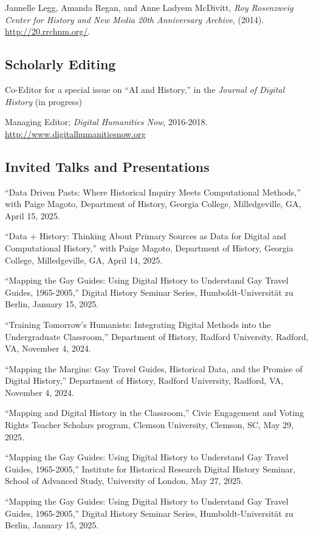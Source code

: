 \documentclass[11pt]{article}
\begin{document}
Jannelle Legg, Amanda Regan, and Anne Ladyem McDivitt, \emph{Roy Rosenzweig Center for History and New Media 20th Anniversary Archive}, (2014). \url{http://20.rrchnm.org/}.

\subsection{Scholarly Editing}
Co-Editor for a special issue on “AI and History,” in the \emph{Journal of Digital History} (in progress)

Managing Editor; \emph{Digital Humanities Now}, 2016-2018. \url{http://www.digitalhumanitiesnow.org}

\subsection{Invited Talks and Presentations}

``Data Driven Pasts: Where Historical Inquiry Meets Computational Methods,'' with Paige Magoto, Department of History, Georgia College, Milledgeville, GA, April 15, 2025.

``Data + History: Thinking About Primary Sources as Data for Digital and Computational History,'' with Paige Magoto, Department of History, Georgia College, Milledgeville, GA, April 14, 2025.

``Mapping the Gay Guides: Using Digital History to Understand Gay Travel Guides, 1965-2005,'' Digital History Seminar Series, Humboldt-Universität zu Berlin, January 15, 2025.

``Training Tomorrow's Humanists: Integrating Digital Methods into the Undergraduate Classroom,'' Department of History, Radford University, Radford, VA, November 4, 2024. 

``Mapping the Margins: Gay Travel Guides, Historical Data, and the Promise of Digital History,'' Department of History, Radford University, Radford, VA, November 4, 2024. 

``Mapping and Digital History in the Classroom,'' Civic Engagement and Voting Rights Teacher Scholars program, Clemson University, Clemson, SC, May 29, 2025.

``Mapping the Gay Guides: Using Digital History to Understand Gay Travel Guides, 1965-2005,'' Institute for Historical Research Digital History Seminar, School of Advanced Study, University of London, May 27, 2025.

``Mapping the Gay Guides: Using Digital History to Understand Gay Travel Guides, 1965-2005,'' Digital History Seminar Series, Humboldt-Universität zu Berlin, January 15, 2025.
\end{document}
